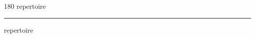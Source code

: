 
\begin{frame}
\begin{center}
\begin{turn}{180}
{\fontsize{2.5cm}{1em}\selectfont repertoire}
\end{turn}
\vspace{1em}\par  
\hrule
\vspace{1em}\par  
{\fontsize{2.5cm}{1em}\selectfont repertoire}
\end{center}
\end{frame}
